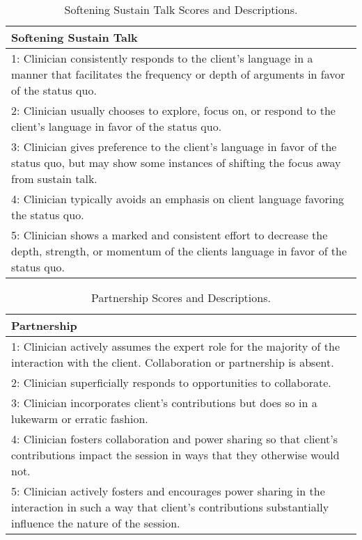 \begin{table*}[tb]
\begin{tabularx}{\textwidth}{X}
\toprule
\textbf{Softening Sustain Talk} \\ \midrule
1: Clinician consistently responds to the client’s language in a manner that facilitates the frequency or depth of arguments in favor of the status quo.                                            \\
2: Clinician usually chooses to explore, focus on, or respond to the client’s language in favor of the status quo.        \\
3: Clinician gives preference to the client’s language in favor of the status quo, but may show some instances of shifting the focus away from sustain talk.                                           \\
4: Clinician typically avoids an emphasis on client language favoring the status quo.                                            \\
5: Clinician shows a marked and consistent effort to decrease the depth, strength, or momentum of the clients language in favor of the status quo.                                            \\
\bottomrule                            
\end{tabularx}
\caption{Softening Sustain Talk Scores and Descriptions.}
\label{tab:softening sustain talk score}
\end{table*}

\begin{table*}[tb]
\begin{tabularx}{\textwidth}{X}
\toprule
\textbf{Partnership} \\ \midrule
1: Clinician actively assumes the expert role for the majority of the interaction with the client. Collaboration or partnership is absent.                                      \\
2: Clinician superficially responds to opportunities to collaborate.        \\
3: Clinician incorporates client’s contributions but does so in a lukewarm or erratic fashion.                                         \\
4: Clinician fosters collaboration and power sharing so that client’s contributions impact the session in ways that they otherwise would not. \\
5: Clinician actively fosters and encourages power sharing in the interaction in such a way that client’s contributions substantially influence the nature of the session.                                \\
\bottomrule                            
\end{tabularx}
\caption{Partnership Scores and Descriptions.}
\label{tab:partnership score}
\end{table*}

